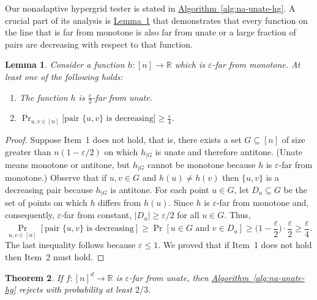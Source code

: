 \documentclass[11pt]{article}
\numberwithin{equation}{section}
\newtheorem{theorem}{Theorem}[section]
\newtheorem{lemma}[theorem]{Lemma}
\theoremstyle{definition}
\theoremstyle{plain}
\newcommand{\R}{\mathbb R}
\newcommand{\expref}[2]{\hyperref[#2]{#1~\ref{#2}}}
\newcommand{\eps}{\varepsilon}
\newcommand{\Alg}[1]{\expref{Algorithm}{alg:#1}}
\newcommand{\Lem}[1]{\expref{Lemma}{lem:#1}}
\begin{document}
Our nonadaptive hypergrid tester is stated in \Alg{na-unate-hg}.
A crucial part of its analysis is \Lem{dychotomy} that demonstrates that every function on the line that is far from monotone is also far from unate or a large fraction of pairs are decreasing with respect to that function.

\begin{lemma}\label{lem:dychotomy}
%
%
%
%
Consider a function $h:[n]\to \R$ which is $\eps$-far from
monotone.
%
%
%
%
%
At least one of the following holds:
\begin{enumerate}
\item
%
The function $h$  %
is $\frac \eps 2$-far from unate.
%
%
\item $\Pr_{u,v \in [n]}\Big[\text{pair } \{u,v\} \text{ is decreasing
}\Big] \geq \frac\eps 4$.
%
%
%
\end{enumerate}
\end{lemma}
\begin{proof}
%
%
Suppose
%
Item~1 does not hold, that is, there exists a set $G\subseteq [n]$ of size greater than $n(1-\eps/2)$ on which $h_{| G}$ is unate and therefore 
%
%
antitone.
%
%
(Unate means monotone or 
%
%
antitone, %
but $h_{|G}$ cannot be monotone because $h$ is $\eps$-far from monotone.) Observe that if $u,v\in G$ and $h(u)\neq h(v)$ then $\{u,v\}$ is a decreasing pair because $h_{|G}$ is 
%
%
antitone. 
%
For each point $u\in G$, let $D_u\subseteq G$ be the set of points on which $h$ differs from $h(u)$. Since $h$ is $\eps$-far from monotone and, consequently, $\eps$-far from constant, $|D_u|\geq\eps/2$ for all $u\in G$. Thus,
\[
\Pr_{u,v \in [n]}[\text{pair } \{u,v\} \text{ is decreasing}]
\geq \Pr[u\in G \text{ and } v\in D_u]\geq \Big(1-\frac\eps 2\Big)\cdot \frac \eps 2\geq \frac \eps 4.
\]
The last inequality follows because $\eps\leq 1$. We proved that if Item~1 does not hold then Item~2 must hold.
\end{proof}

\begin{theorem} \label{thm:non-adap-hyper} If $f:[n]^d \to \R$ is $\eps$-far
	from unate, then \Alg{na-unate-hg} rejects with probability at least $2/3$.
\end{theorem}
\end{document}
